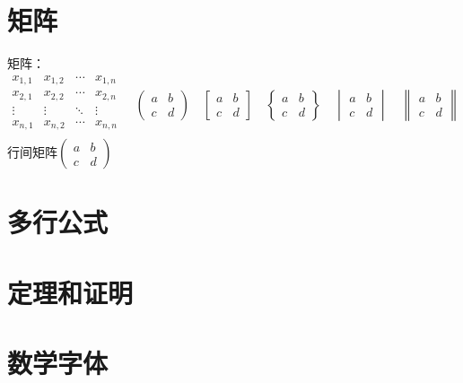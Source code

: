 \documentclass{article}
\begin{document}
		\section{矩阵}
		矩阵：\\
		\[
		\begin{array}{cccc}
			x_{1,1} & x_{1,2} & \cdots & x_{1,n} \\
			x_{2,1} & x_{2,2} & \cdots & x_{2,n} \\
			\vdots & \vdots & \ddots & \vdots \\
			x_{n,1} & x_{n,2} & \cdots & x_{n,n} \\
		\end{array} \quad
		\begin{pmatrix} a & b \\ c & d \end{pmatrix} \quad
		\begin{bmatrix} a & b \\ c & d \end{bmatrix} \quad
		\begin{Bmatrix} a & b \\ c & d \end{Bmatrix} \quad
		\begin{vmatrix} a & b \\ c & d \end{vmatrix} \quad
		\begin{Vmatrix} a & b \\ c & d \end{Vmatrix} 
		\]
		行间矩阵$( \begin{smallmatrix}
			a & b \\ c & d
		\end{smallmatrix} )$
		\section{多行公式}
		\section{定理和证明}
		\section{数学字体}		
\end{document}
